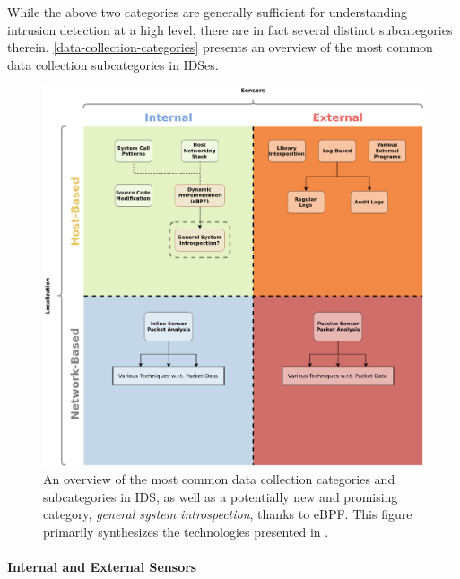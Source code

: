 \documentclass[
  12pt]{findlay}
\begin{document}
While the above two categories are generally sufficient for
understanding intrusion detection at a high level, there are in fact
several distinct subcategories therein.
\autoref{data-collection-categories} presents an overview of the most
common data collection subcategories in IDSes.

\begin{figure}
\includegraphics{../figures/data-collection-categories.png}
\caption[An overview of the most common data collection categories and subcategories in IDS]
{An overview of the most common data collection categories and subcategories in IDS,
as well as a potentially new and promising category, {\itshape general system introspection}, thanks to eBPF.
This figure primarily synthesizes the technologies presented in \cite{spafford02, stallings07}.}
\label{data-collection-categories}
\end{figure}

\hypertarget{internal-and-external-sensors}{%
\paragraph{Internal and External
Sensors}\label{internal-and-external-sensors}}
\end{document}
